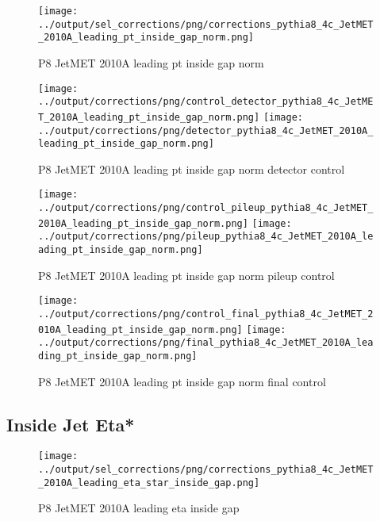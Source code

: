 \documentclass[11pt]{book}
\begin{document}
\begin{figure}[ht]
\centering
\texttt{[image: ../output/sel\_corrections/png/corrections\_pythia8\_4c\_JetMET\_2010A\_leading\_pt\_inside\_gap\_norm.png]}
\caption{P8 JetMET 2010A leading pt inside gap norm}
\label{fig:p8_JetMET_2010A_leading_pt_inside_gap_norm}
\end{figure}

\begin{figure}[ht]
\centering
\texttt{[image: ../output/corrections/png/control\_detector\_pythia8\_4c\_JetMET\_2010A\_leading\_pt\_inside\_gap\_norm.png]}
\texttt{[image: ../output/corrections/png/detector\_pythia8\_4c\_JetMET\_2010A\_leading\_pt\_inside\_gap\_norm.png]}
\caption{P8 JetMET 2010A leading pt inside gap norm detector control}
\label{fig:p8_JetMET_2010A_leading_pt_inside_gap_norm_detector_control}
\end{figure}

\begin{figure}[ht]
\centering
\texttt{[image: ../output/corrections/png/control\_pileup\_pythia8\_4c\_JetMET\_2010A\_leading\_pt\_inside\_gap\_norm.png]}
\texttt{[image: ../output/corrections/png/pileup\_pythia8\_4c\_JetMET\_2010A\_leading\_pt\_inside\_gap\_norm.png]}
\caption{P8 JetMET 2010A leading pt inside gap norm pileup control}
\label{fig:p8_JetMET_2010A_leading_pt_inside_gap_norm_pileup_control}
\end{figure}


\begin{figure}[ht]
\centering
\texttt{[image: ../output/corrections/png/control\_final\_pythia8\_4c\_JetMET\_2010A\_leading\_pt\_inside\_gap\_norm.png]}
\texttt{[image: ../output/corrections/png/final\_pythia8\_4c\_JetMET\_2010A\_leading\_pt\_inside\_gap\_norm.png]}
\caption{P8 JetMET 2010A leading pt inside gap norm final control}
\label{fig:p8_JetMET_2010A_leading_pt_inside_gap_norm_final_control}
\end{figure}


\clearpage
\subsection{Inside Jet Eta*}
\begin{figure}[ht]
\centering
\texttt{[image: ../output/sel\_corrections/png/corrections\_pythia8\_4c\_JetMET\_2010A\_leading\_eta\_star\_inside\_gap.png]}
\caption{P8 JetMET 2010A leading eta inside gap}
\label{fig:p8_JetMET_2010A_leading_eta_star_inside_gap}
\end{figure}
\end{document}
